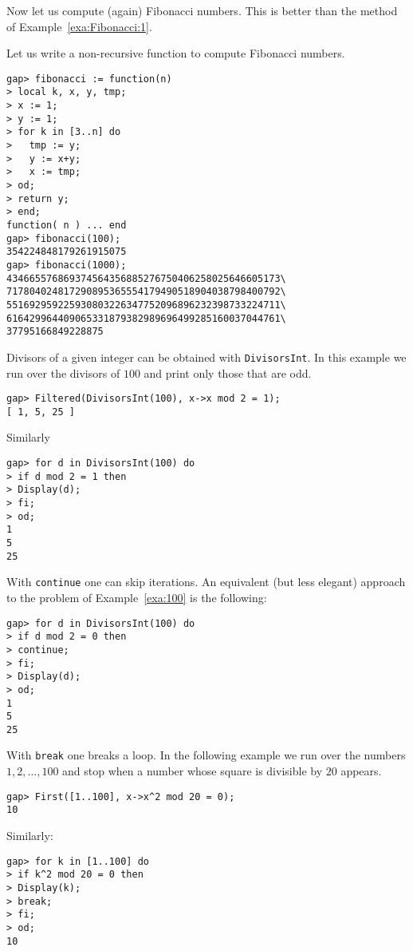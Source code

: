 Now let us compute (again) Fibonacci numbers. This is better than the method of
Example~\ref{exa:Fibonacci:1}. 

\begin{example}
\label{exa:Fibonacci:2}
Let us write a non-recursive function to compute Fibonacci numbers. 
\begin{lstlisting}
gap> fibonacci := function(n)                                                 
> local k, x, y, tmp;
> x := 1;
> y := 1;
> for k in [3..n] do
>   tmp := y;
>   y := x+y;
>   x := tmp;
> od; 
> return y;
> end;
function( n ) ... end
gap> fibonacci(100);
354224848179261915075
gap> fibonacci(1000);
434665576869374564356885276750406258025646605173\
717804024817290895365554179490518904038798400792\
551692959225930803226347752096896232398733224711\
616429964409065331879382989696499285160037044761\
37795166849228875
\end{lstlisting}
\end{example}

\begin{example}
\label{exa:100}
Divisors of a given integer can be obtained with \lstinline{DivisorsInt}.  In this
example we run over the divisors of $100$ and print only those that are
odd.
\begin{lstlisting}
gap> Filtered(DivisorsInt(100), x->x mod 2 = 1);
[ 1, 5, 25 ]
\end{lstlisting}
Similarly 
\begin{lstlisting}
gap> for d in DivisorsInt(100) do
> if d mod 2 = 1 then
> Display(d);
> fi;
> od;
1
5
25
\end{lstlisting}
With \lstinline{continue} one can skip iterations. An equivalent (but less
elegant) approach to the problem of Example~\ref{exa:100} is the following:
\begin{lstlisting}
gap> for d in DivisorsInt(100) do
> if d mod 2 = 0 then
> continue;
> fi;
> Display(d);
> od;
1
5
25
\end{lstlisting}
\end{example}

With \lstinline{break} one breaks a loop. In the following example we run over
the numbers $1,2,\dots,100$ and stop when a number whose square is divisible by
$20$ appears. 
\begin{lstlisting}
gap> First([1..100], x->x^2 mod 20 = 0);
10
\end{lstlisting}
Similarly:
\begin{lstlisting}
gap> for k in [1..100] do
> if k^2 mod 20 = 0 then
> Display(k);
> break;
> fi;
> od;
10
\end{lstlisting}

